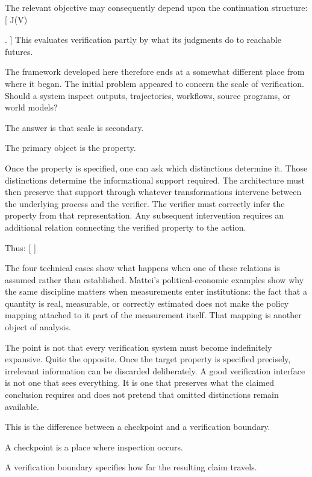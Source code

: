 \documentclass[11pt]{article}
\begin{document}
The relevant objective may consequently depend upon the continuation structure:
[
J(V)

.
]
This evaluates verification partly by what its judgments do to reachable futures.

The framework developed here therefore ends at a somewhat different place from where it began. The initial problem appeared to concern the scale of verification. Should a system inspect outputs, trajectories, workflows, source programs, or world models?

The answer is that scale is secondary.

The primary object is the property.

Once the property is specified, one can ask which distinctions determine it. Those distinctions determine the informational support required. The architecture must then preserve that support through whatever transformations intervene between the underlying process and the verifier. The verifier must correctly infer the property from that representation. Any subsequent intervention requires an additional relation connecting the verified property to the action.

Thus:
[
]

The four technical cases show what happens when one of these relations is assumed rather than established. Mattei's political-economic examples show why the same discipline matters when measurements enter institutions: the fact that a quantity is real, measurable, or correctly estimated does not make the policy mapping attached to it part of the measurement itself. That mapping is another object of analysis.

The point is not that every verification system must become indefinitely expansive. Quite the opposite. Once the target property is specified precisely, irrelevant information can be discarded deliberately. A good verification interface is not one that sees everything. It is one that preserves what the claimed conclusion requires and does not pretend that omitted distinctions remain available.

This is the difference between a checkpoint and a verification boundary.

A checkpoint is a place where inspection occurs.

A verification boundary specifies how far the resulting claim travels.
\end{document}
